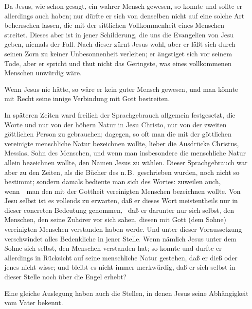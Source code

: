 \begin{aufzb}
\item Da Jesus, wie schon gesagt, ein wahrer Mensch gewesen, so konnte und sollte er allerdings auch  haben; nur dürfte er sich von denselben nicht auf eine solche Art beherrschen lassen, die mit der sittlichen Vollkommenheit eines Menschen streitet. Dieses aber ist in jener Schilderung, die uns die Evangelien von Jesu geben, niemals der Fall. Nach dieser zürnt Jesus wohl, aber er läßt sich durch seinen Zorn zu keiner Unbesonnenheit verleiten; er ängstiget sich vor seinem Tode, aber er spricht und thut nicht das Geringste, was eines vollkommenen Menschen unwürdig wäre.
\item Wenn Jesus nie  hätte, so wäre er kein guter Mensch gewesen, und man könnte mit Recht seine innige Verbindung mit Gott bestreiten.
\item In späteren Zeiten ward freilich der Sprachgebrauch allgemein festgesetzt, die Worte  und  nur von der höhern Natur in Jesu Christo, nur von der zweiten göttlichen Person zu gebrauchen; dagegen, so oft man die mit der göttlichen vereinigte menschliche Natur bezeichnen wollte, lieber die Ausdrücke Christus, Messias, Sohn des Menschen, und wenn man insbesondere die menschliche Natur allein bezeichnen wollte, den Namen Jesus zu wählen. Dieser Sprachgebrauch war aber zu den Zeiten, als die Bücher des n.\,B.\ geschrieben wurden, noch nicht so bestimmt; sondern damals bediente man sich des Wortes:  zuweilen auch, wenn~\ man den mit der Gottheit vereinigten Menschen bezeichnen wollte. Von Jesu selbst ist es vollends zu erwarten, daß er dieses Wort meistentheils nur in dieser concreten Bedeutung genommen, \dh\, daß er darunter nur sich selbst, den Menschen, den seine Zuhörer vor sich sahen, diesen mit Gott (dem Sohne) vereinigten Menschen verstanden haben werde. Und unter dieser Voraussetzung verschwindet alles Bedenkliche in jener Stelle. Wenn nämlich Jesus unter dem Sohne sich selbst, den Menschen verstanden hat; so konnte und durfte er allerdings in Rücksicht auf seine menschliche Natur gestehen, daß er dieß oder jenes nicht wisse; und bleibt es nicht immer merkwürdig, daß er sich selbst in dieser Stelle noch über die Engel erhebt?
\item Eine gleiche Auslegung haben auch die Stellen, in denen Jesus seine Abhängigkeit vom Vater bekennt. 

\end{aufzb}
